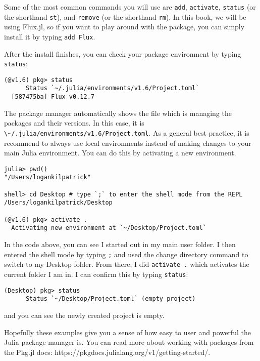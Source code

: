 \documentclass[
  notoc %
]{tufte-book}
\newcommand{\passthrough}[1]{#1}
\begin{document}
Some of the most common commands you will use are
\passthrough{\lstinline!add!}, \passthrough{\lstinline!activate!},
\passthrough{\lstinline!status!} (or the shorthand
\passthrough{\lstinline!st!}), and \passthrough{\lstinline!remove!} (or
the shorthand \passthrough{\lstinline!rm!}). In this book, we will be
using Flux.jl, so if you want to play around with the package, you can
simply install it by typing \passthrough{\lstinline!add Flux!}.

After the install finishes, you can check your package environment by
typing \passthrough{\lstinline!status!}:

\begin{lstlisting}
(@v1.6) pkg> status
      Status `~/.julia/environments/v1.6/Project.toml`
  [587475ba] Flux v0.12.7
\end{lstlisting}

The package manager automatically shows the file which is managing the
packages and their versions. In this case, it is
\passthrough{\lstinline!\~/.julia/environments/v1.6/Project.toml!}. As a
general best practice, it is recommend to always use local environments
instead of making changes to your main Julia environment. You can do
this by activating a new environment.

\begin{lstlisting}
julia> pwd()
"/Users/logankilpatrick"

shell> cd Desktop # type `;` to enter the shell mode from the REPL
/Users/logankilpatrick/Desktop

(@v1.6) pkg> activate .
  Activating new environment at `~/Desktop/Project.toml`
\end{lstlisting}

In the code above, you can see I started out in my main user folder. I
then entered the shell mode by typing \passthrough{\lstinline!;!} and
used the change directory command to switch to my Desktop folder. From
there, I did \passthrough{\lstinline!activate .!} which activates the
current folder I am in. I can confirm this by typing
\passthrough{\lstinline!status!}:

\begin{lstlisting}
(Desktop) pkg> status
      Status `~/Desktop/Project.toml` (empty project)
\end{lstlisting}

and you can see the newly created project is empty.

Hopefully these examples give you a sense of how easy to user and
powerful the Julia package manager is. You can read more about working
with packages from the Pkg.jl docs:
https://pkgdocs.julialang.org/v1/getting-started/.
\end{document}
